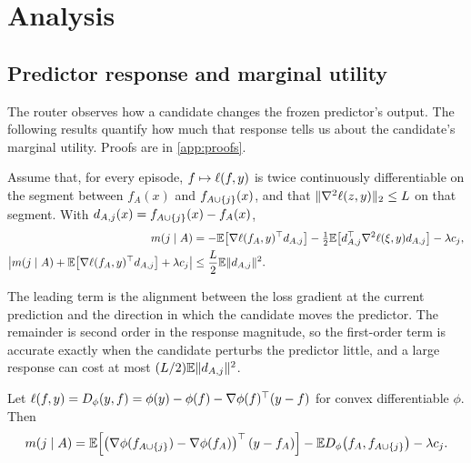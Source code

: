 \section{Analysis}
\label{sec:analysis}

\subsection{Predictor response and marginal utility}

The router observes how a candidate changes the frozen predictor's output.
The following results quantify how much that response tells us about the
candidate's marginal utility. Proofs are in \cref{app:proofs}.

\begin{proposition}
\label{prop:expansion}
Assume that, for every episode, $f\mapsto\ell(f,y)$ is twice continuously
differentiable on the segment between $f_A(x)$ and $f_{A\cup\{j\}}(x)$, and
that $\|\nabla^2\ell(z,y)\|_2\leq L$ on that segment. With
$d_{A,j}(x)=f_{A\cup\{j\}}(x)-f_A(x)$,
\begin{align}
 m(j\mid A)
 &=
 -\mathbb{E}\!\left[\nabla\ell(f_A,y)^\top d_{A,j}\right]
 -\tfrac12\mathbb{E}\!\left[d_{A,j}^\top\nabla^2\ell(\xi,y)d_{A,j}\right]
 -\lambda c_j,
 \label{eq:prop1-exact}\\
 \left|m(j\mid A)
 +\mathbb{E}\!\left[\nabla\ell(f_A,y)^\top d_{A,j}\right]+\lambda c_j\right|
 &\leq
 \frac{L}{2}\mathbb{E}\|d_{A,j}\|^2 .
 \label{eq:prop1-bound}
\end{align}
\end{proposition}

The leading term is the alignment between the loss gradient at the current
prediction and the direction in which the candidate moves the predictor. The
remainder is second order in the response magnitude, so the first-order term is
accurate exactly when the candidate perturbs the predictor little, and a large
response can cost at most $(L/2)\mathbb{E}\|d_{A,j}\|^2$.

\begin{proposition}
\label{prop:bregman}
Let $\ell(f,y)=D_\phi(y,f)=\phi(y)-\phi(f)-\nabla\phi(f)^\top(y-f)$ for convex
differentiable $\phi$. Then
\begin{equation}
 m(j\mid A)
 =
 \mathbb{E}\!\left[\left(\nabla\phi(f_{A\cup\{j\}})-\nabla\phi(f_A)\right)^\top(y-f_A)\right]
 -\mathbb{E} D_\phi\!\left(f_A,f_{A\cup\{j\}}\right)
 -\lambda c_j .
 \label{eq:prop2}
\end{equation}
\end{proposition}

